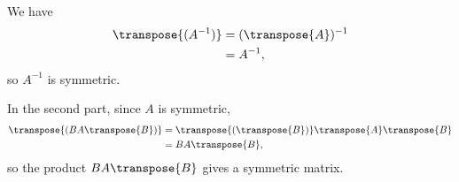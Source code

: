 
\noindent We have
\begin{align*}
    \transpose{(A^{-1})} &= (\transpose{A})^{-1} \\
    &= A^{-1},
\end{align*}
so $A^{-1}$ is symmetric.

In the second part, since $A$ is symmetric,
\begin{align*}
    \transpose{(BA\transpose{B})} &= \transpose{(\transpose{B})}\transpose{A}\transpose{B} \\
    &= BA\transpose{B},
\end{align*}
so the product $BA\transpose{B}$ gives a symmetric matrix.
